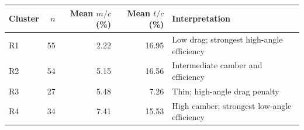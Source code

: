 \begin{tabular}{lrrrl}
\toprule
Cluster & $n$ & Mean $m/c$ (\%) & Mean $t/c$ (\%) & Interpretation\\
\midrule
R1 & 55 & 2.22 & 16.95 & Low drag; strongest high-angle efficiency\\
R2 & 54 & 5.15 & 16.56 & Intermediate camber and efficiency\\
R3 & 27 & 5.48 & 7.26 & Thin; high-angle drag penalty\\
R4 & 34 & 7.41 & 15.53 & High camber; strongest low-angle efficiency\\
\bottomrule
\end{tabular}
